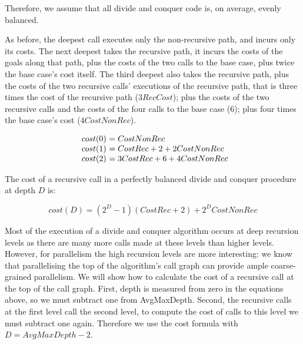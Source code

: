 \noindent
Therefore, we assume that all divide and conquer code is, on average,
evenly balanced.

As before, the deepest call executes only the non-recursive path,
and incurs only its costs.
The next deepest takes the recursive path,
it incurs the costs of the goals along that path,
plus the costs of the two calls to the base case,
plus twice the base case's cost itself.
The third deepest also takes the recursive path,
plus the costs of the two recursive calls' executions of the recursive path,
that is three times the cost of the recursive path ($3{RecCost}$);
plus the costs of the two recursive calls and the costs of the four calls to
the base case ($6$);
plus four times the base case's cost ($4{CostNonRec}$).

\[
\begin{array}{r @{}l @{}l}
cost(0)~&= CostNonRec \\
cost(1)~&= CostRec + 2 + 2{CostNonRec} \\
cost(2)~&= 3{CostRec} + 6 + 4{CostNonRec} \\
\end{array}
\]

\noindent
The cost of a recursive call in a perfectly balanced divide and conquer
procedure at depth $D$ is:

\begin{equation*}
cost(D) = (2^D-1)(CostRec + 2) + 2^D{CostNonRec}
\end{equation*}

Most of the execution of a divide and conquer algorithm occurs at deep
recursion levels as there are many more calls made at these levels than higher
levels.
However, for parallelism the high recursion levels are more interesting:
we know that parallelising the top of the algorithm's call graph can provide
ample coarse-grained parallelism.
We will show how to calculate the cost of a recursive call at the top of the
call graph.
First, depth is measured from zero in the equations above, so we must
subtract one from AvgMaxDepth.
Second, the recursive calls at the first level call the second level,
to compute the cost of calls to this level we must subtract one again.
Therefore we use the cost formula with $D = AvgMaxDepth - 2$.

